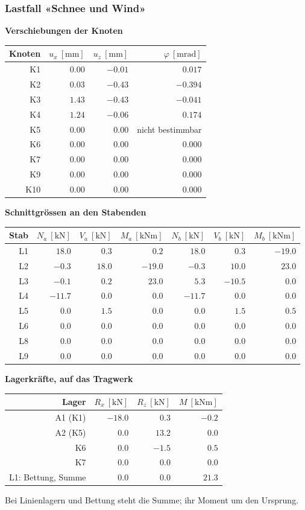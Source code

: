 \documentclass[11pt,a4paper]{article}
\begin{document}
\subsubsection{Lastfall «Schnee und Wind»}
\noindent\textbf{Verschiebungen der Knoten}
\begin{longtable}{rrrr}
\hline
Knoten & $u_x\ [\mathrm{mm}]$ & $u_z\ [\mathrm{mm}]$ & $\varphi\ [\mathrm{mrad}]$ \\
\hline
\endhead
K1 & $0.00$ & $-0.01$ & $0.017$ \\
K2 & $0.03$ & $-0.43$ & $-0.394$ \\
K3 & $1.43$ & $-0.43$ & $-0.041$ \\
K4 & $1.24$ & $-0.06$ & $0.174$ \\
K5 & $0.00$ & $0.00$ & nicht bestimmbar \\
K6 & $0.00$ & $0.00$ & $0.000$ \\
K7 & $0.00$ & $0.00$ & $0.000$ \\
K9 & $0.00$ & $0.00$ & $0.000$ \\
K10 & $0.00$ & $0.00$ & $0.000$ \\
\hline
\end{longtable}
\noindent\textbf{Schnittgrössen an den Stabenden}
\begin{longtable}{rrrrrrr}
\hline
Stab & $N_{a}\ [\mathrm{kN}]$ & $V_{a}\ [\mathrm{kN}]$ & $M_{a}\ [\mathrm{kNm}]$ & $N_{b}\ [\mathrm{kN}]$ & $V_{b}\ [\mathrm{kN}]$ & $M_{b}\ [\mathrm{kNm}]$ \\
\hline
\endhead
L1 & $18.0$ & $0.3$ & $0.2$ & $18.0$ & $0.3$ & $-19.0$ \\
L2 & $-0.3$ & $18.0$ & $-19.0$ & $-0.3$ & $10.0$ & $23.0$ \\
L3 & $-0.1$ & $0.2$ & $23.0$ & $5.3$ & $-10.5$ & $0.0$ \\
L4 & $-11.7$ & $0.0$ & $0.0$ & $-11.7$ & $0.0$ & $0.0$ \\
L5 & $0.0$ & $1.5$ & $0.0$ & $0.0$ & $1.5$ & $0.5$ \\
L6 & $0.0$ & $0.0$ & $0.0$ & $0.0$ & $0.0$ & $0.0$ \\
L8 & $0.0$ & $0.0$ & $0.0$ & $0.0$ & $0.0$ & $0.0$ \\
L9 & $0.0$ & $0.0$ & $0.0$ & $0.0$ & $0.0$ & $0.0$ \\
\hline
\end{longtable}
\noindent\textbf{Lagerkräfte, auf das Tragwerk}
\begin{longtable}{rrrr}
\hline
Lager & $R_x\ [\mathrm{kN}]$ & $R_z\ [\mathrm{kN}]$ & $M\ [\mathrm{kNm}]$ \\
\hline
\endhead
A1 (K1) & $-18.0$ & $0.3$ & $-0.2$ \\
A2 (K5) & $0.0$ & $13.2$ & $0.0$ \\
K6 & $0.0$ & $-1.5$ & $0.5$ \\
K7 & $0.0$ & $0.0$ & $0.0$ \\
L1: Bettung, Summe & $0.0$ & $0.0$ & $21.3$ \\
\hline
\end{longtable}
Bei Linienlagern und Bettung steht die Summe; ihr Moment um den Ursprung.
\end{document}
